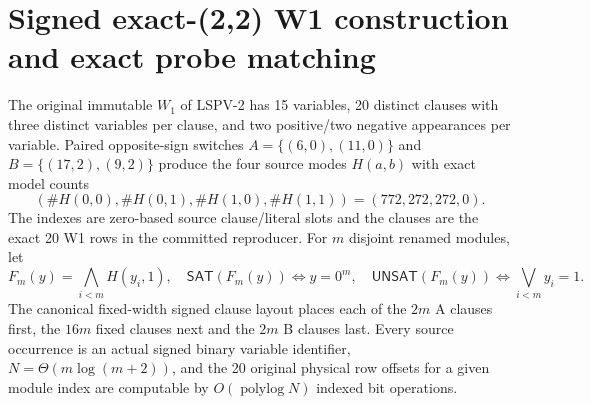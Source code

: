 \documentclass[11pt]{article}
\newcommand{\SAT}{\mathsf{SAT}}
\newcommand{\UNSAT}{\mathsf{UNSAT}}
\begin{document}
\section{Signed exact-(2,2) W1 construction and exact probe matching}
The original immutable $W_1$ of LSPV-2 has 15 variables, 20 distinct clauses with three distinct variables per clause, and two positive/two negative appearances per variable. Paired opposite-sign switches $A=\{(6,0),(11,0)\}$ and $B=\{(17,2),(9,2)\}$ produce the four source modes $H(a,b)$ with exact model counts
\[
 (\#H(0,0),\#H(0,1),\#H(1,0),\#H(1,1))=(772,272,272,0).\tag{3}
\]
The indexes are zero-based source clause/literal slots and the clauses are the exact 20 W1 rows in the committed reproducer. For $m$ disjoint renamed modules, let
\[
 F_m(y)=\bigwedge_{i<m}H(y_i,1),\quad
 \SAT(F_m(y))\iff y=0^m,\quad
 \UNSAT(F_m(y))\iff\bigvee_{i<m}y_i=1.\tag{4}
\]
The canonical fixed-width signed clause layout places each of the $2m$ A clauses first, the $16m$ fixed clauses next and the $2m$ B clauses last. Every source occurrence is an actual signed binary variable identifier, $N=\Theta(m\log(m+2))$, and the 20 original physical row offsets for a given module index are computable by $O(\operatorname{polylog}N)$ indexed bit operations.
\end{document}
